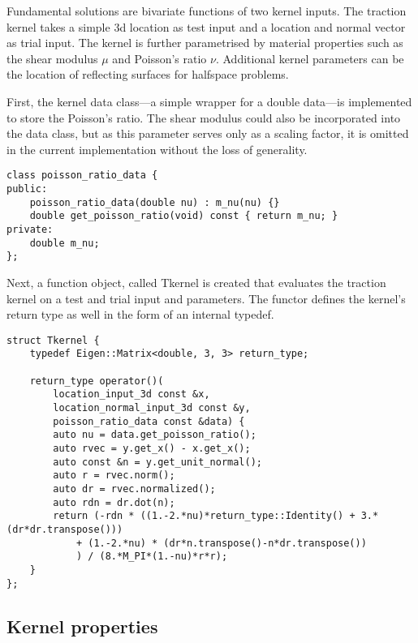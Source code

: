 \documentclass{article}
\begin{document}
Fundamental solutions are bivariate functions of two kernel inputs.
The traction kernel takes a simple 3d location as test input and a location and normal vector as trial input.
The kernel is further parametrised by material properties such as the shear modulus $\mu$ and Poisson's ratio $\nu$. Additional kernel parameters can be the location of reflecting surfaces for halfspace problems.

First, the kernel data class---a simple wrapper for a double data---is implemented to store the Poisson's ratio.
The shear modulus could also be incorporated into the data class, but as this parameter serves only as a scaling factor, it is omitted in the current implementation without the loss of generality.

\begin{lstlisting}
class poisson_ratio_data {
public:
	poisson_ratio_data(double nu) :	m_nu(nu) {}
	double get_poisson_ratio(void) const { return m_nu; }
private:
	double m_nu;
};
\end{lstlisting}

Next, a function object, called Tkernel is created that evaluates the traction kernel on a test and trial input and parameters. The functor defines the kernel's return type as well in the form of an internal typedef.
%
\begin{lstlisting}
struct Tkernel {
	typedef Eigen::Matrix<double, 3, 3> return_type;
	
	return_type operator()(
		location_input_3d const &x,
		location_normal_input_3d const &y,
		poisson_ratio_data const &data) {
		auto nu = data.get_poisson_ratio();
		auto rvec = y.get_x() - x.get_x();
		auto const &n = y.get_unit_normal();
		auto r = rvec.norm();
		auto dr = rvec.normalized();
		auto rdn = dr.dot(n);
		return (-rdn * ((1.-2.*nu)*return_type::Identity() + 3.*(dr*dr.transpose()))
			+ (1.-2.*nu) * (dr*n.transpose()-n*dr.transpose())
			) / (8.*M_PI*(1.-nu)*r*r);
	}
};
\end{lstlisting}

\subsection{Kernel properties}
\end{document}
